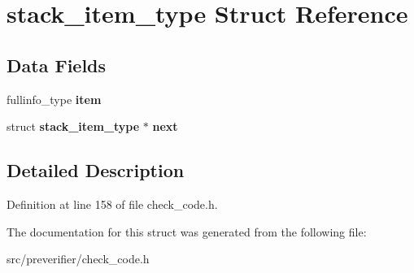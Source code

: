 \section{stack\_\-item\_\-type Struct Reference}
\label{structstack__item__type}
\subsection*{Data Fields}
\begin{DoxyCompactItemize}
\item 
fullinfo\_\-type {\bfseries item}\label{structstack__item__type_aa7211236f6db48983f3061e610d4c62d}

\item 
struct {\bf stack\_\-item\_\-type} $\ast$ {\bfseries next}\label{structstack__item__type_a544f84c4a3ae32b2e11db40b2960e875}

\end{DoxyCompactItemize}


\subsection{Detailed Description}


Definition at line 158 of file check\_\-code.h.



The documentation for this struct was generated from the following file:\begin{DoxyCompactItemize}
\item 
src/preverifier/check\_\-code.h\end{DoxyCompactItemize}

